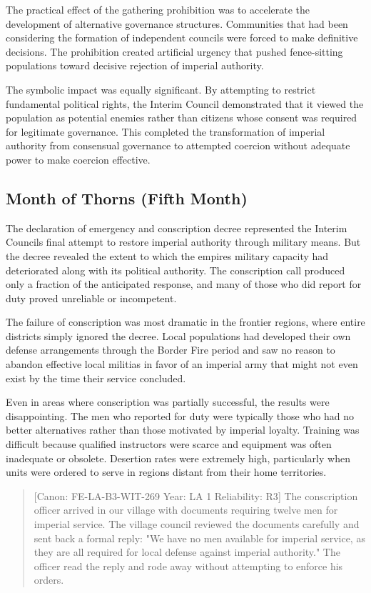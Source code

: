 The practical effect of the gathering prohibition was to accelerate the
development of alternative governance structures. Communities that had
been considering the formation of independent councils were forced to
make definitive decisions. The prohibition created artificial urgency
that pushed fence-sitting populations toward decisive rejection of
imperial authority.

The symbolic impact was equally significant. By attempting to restrict
fundamental political rights, the Interim Council demonstrated that it
viewed the population as potential enemies rather than citizens whose
consent was required for legitimate governance. This completed the
transformation of imperial authority from consensual governance to
attempted coercion without adequate power to make coercion effective.

\subsection{Month of Thorns (Fifth
Month)}\label{month-of-thorns-fifth-month}

The declaration of emergency and conscription decree represented the
Interim Council\textquotesingle s final attempt to restore imperial
authority through military means. But the decree revealed the extent to
which the empire\textquotesingle s military capacity had deteriorated
along with its political authority. The conscription call produced only
a fraction of the anticipated response, and many of those who did report
for duty proved unreliable or incompetent.

The failure of conscription was most dramatic in the frontier regions,
where entire districts simply ignored the decree. Local populations had
developed their own defense arrangements through the Border Fire period
and saw no reason to abandon effective local militias in favor of an
imperial army that might not even exist by the time their service
concluded.

Even in areas where conscription was partially successful, the results
were disappointing. The men who reported for duty were typically those
who had no better alternatives rather than those motivated by imperial
loyalty. Training was difficult because qualified instructors were
scarce and equipment was often inadequate or obsolete. Desertion rates
were extremely high, particularly when units were ordered to serve in
regions distant from their home territories.

\begin{quote}
{[}Canon: FE-LA-B3-WIT-269 \textbar{} Year: LA 1 \textbar{} Reliability:
R3{]} The conscription officer arrived in our village with documents
requiring twelve men for imperial service. The village council reviewed
the documents carefully and sent back a formal reply: "We have no men
available for imperial service, as they are all required for local
defense against imperial authority." The officer read the reply and rode
away without attempting to enforce his orders.
\end{quote}

